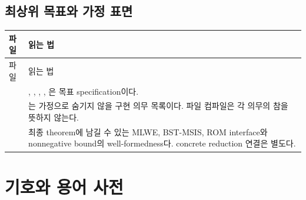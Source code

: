 \subsection{최상위 목표와 가정 표면}

\begin{longtable}{L{58mm} L{89mm}}
\toprule
파일 & 읽는 법 \\
\midrule
\endfirsthead
\toprule
파일 & 읽는 법 \\
\midrule
\endhead
{} &
, , ,
,
은 목표 specification이다. \\
\allowbreak
{} &
는 가정으로 숨기지 않을 구현 의무 목록이다. 파일 컴파일은
각 의무의 참을 뜻하지 않는다. \\
 &
최종 theorem에 남길 수 있는 MLWE, BST-MSIS, ROM interface와 nonnegative bound의
well-formedness다. concrete reduction 연결은 별도다. \\
\bottomrule
\end{longtable}

\section{기호와 용어 사전}
\label{sec:glossary}

